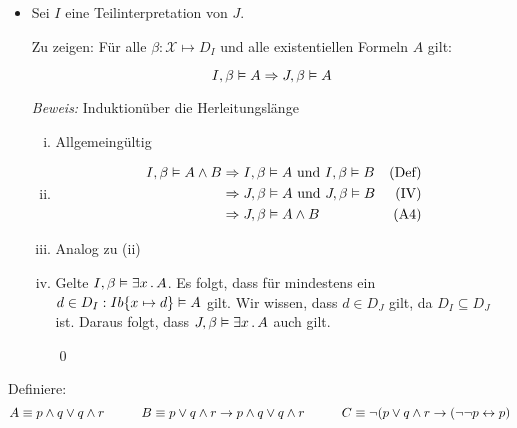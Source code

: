 



\date{Donnerstag 14.11.2019}

\newcommand\X{\mathcal{X}}

\newcommand{\DNF}[1]{\mathrm{\,DNF({#1})}}
\newcommand{\KNF}[1]{\mathrm{\,KNF({#1})}}


\maketitle
\thispagestyle{fancy}


\begin{itemize}
	\item[] Sei $I$ eine Teilinterpretation von $J$. 
	
	Zu zeigen: Für alle $\beta : \X \mapsto D_I$ und alle existentiellen Formeln $A$ gilt:
	
	$$ I, \beta \vDash A \Rightarrow J, \beta \vDash A $$
	
	\textit{Beweis:} Induktionüber die Herleitungslänge
	
	\begin{enumerate}[(i)]
	
		\item Allgemeingültig
		\item 
		
			\begin{align*}
				I, \beta \vDash A \land B & \Rightarrow I, \beta \vDash A \text{ und } I, \beta \vDash B & \text{(Def)} \\
				 & \Rightarrow J, \beta \vDash A \text{ und } J, \beta \vDash B & \text{(IV)} \\
				 & \Rightarrow J, \beta \vDash A\land B & \text{(A4)}
			\end{align*}
			
			
		\item Analog zu (ii)
		
		\item Gelte $I, \beta \vDash \exists x \, . \, A$. Es folgt, dass für mindestens ein $d\in D_I : Ib\{x \mapsto d\}\vDash A$ gilt. Wir wissen, dass $d \in D_J$ gilt, da $D_I \subseteq D_J$ ist. Daraus folgt, dass $J, \beta \vDash \exists x \, . \,A$ auch gilt.
	
	
	\qed
	\end{enumerate}
\end{itemize}


Definiere:
$$	A \equiv p \land q \lor q \land r \hspace{.4in}
	B \equiv p \lor q \land r \rightarrow p \land q \lor q \land r \hspace{.4in}
	C \equiv \lnot ( p \lor q \land r \rightarrow (\lnot \lnot p \leftrightarrow p)
$$


